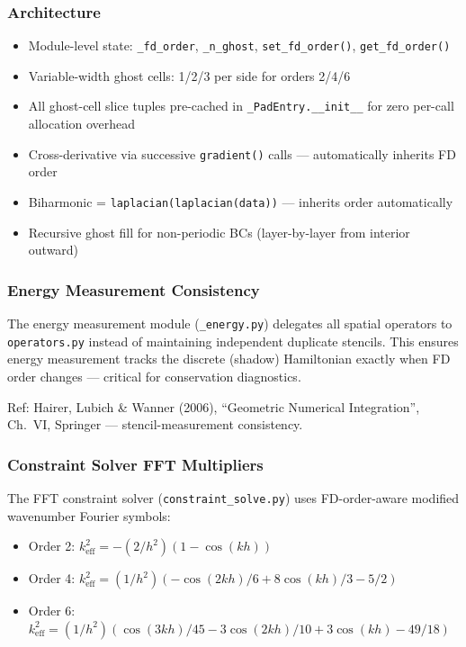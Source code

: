 \subsubsection{Architecture}
\label{sec:fd-architecture}

\begin{itemize}
  \item Module-level state: \texttt{\_fd\_order}, \texttt{\_n\_ghost}, \texttt{set\_fd\_order()}, \texttt{get\_fd\_order()}
  \item Variable-width ghost cells: 1/2/3 per side for orders 2/4/6
  \item All ghost-cell slice tuples pre-cached in \texttt{\_PadEntry.\_\_init\_\_} for zero
    per-call allocation overhead
  \item Cross-derivative via successive \texttt{gradient()} calls --- automatically inherits FD order
  \item Biharmonic = \texttt{laplacian(laplacian(data))} --- inherits order automatically
  \item Recursive ghost fill for non-periodic BCs (layer-by-layer from interior outward)
\end{itemize}

\subsubsection{Energy Measurement Consistency}
\label{sec:energy-consistency}

The energy measurement module (\texttt{\_energy.py}) delegates all spatial operators
to \texttt{operators.py} instead of maintaining independent duplicate stencils. This
ensures energy measurement tracks the discrete (shadow) Hamiltonian exactly
when FD order changes --- critical for conservation diagnostics.

Ref: Hairer, Lubich \& Wanner (2006), ``Geometric Numerical Integration'',
Ch.~VI, Springer --- stencil-measurement consistency.

\subsubsection{Constraint Solver FFT Multipliers}
\label{sec:fft-multipliers}

The FFT constraint solver (\texttt{constraint\_solve.py}) uses FD-order-aware modified
wavenumber Fourier symbols:

\begin{itemize}
  \item Order 2: $k_\mathrm{eff}^2 = -(2/h^2)(1 - \cos(kh))$
  \item Order 4: $k_\mathrm{eff}^2 = (1/h^2)(-\cos(2kh)/6 + 8\cos(kh)/3 - 5/2)$
  \item Order 6: $k_\mathrm{eff}^2 = (1/h^2)(\cos(3kh)/45 - 3\cos(2kh)/10 + 3\cos(kh) - 49/18)$
\end{itemize}

